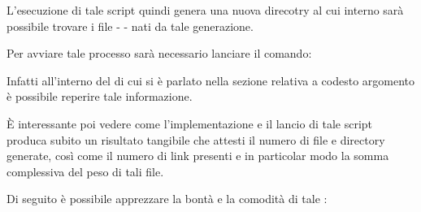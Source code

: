 \documentclass[letterpaper,10pt,italian,openany,oneside]{sphinxmanual}
\begin{document}
L’esecuzione di tale script quindi genera una nuova direcotry  al cui interno sarà possibile
trovare i file -  - nati da tale generazione.

Per avviare tale processo sarà necessario lanciare il comando:

\begin{sphinxVerbatim}[commandchars=\\\{\}]
 
\end{sphinxVerbatim}

Infatti all’interno del  di cui si è parlato nella sezione relativa a codesto argomento è possibile reperire tale informazione.

È interessante poi vedere come l’implementazione e il lancio di tale script produca subito un risultato tangibile che attesti il numero di file
e directory generate, così come il numero di link presenti e in particolar modo la somma complessiva del peso di tali file.

Di seguito è possibile apprezzare la bontà e la comodità di tale :
\end{document}
